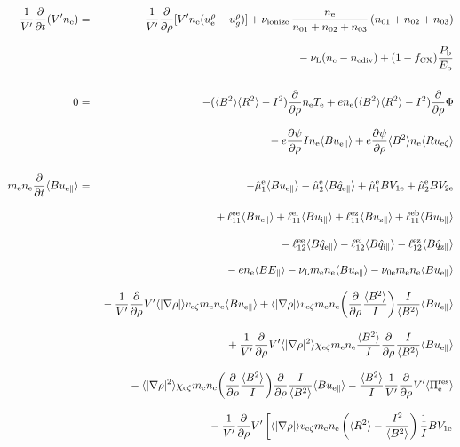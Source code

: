 \documentclass[11pt]{article}
\def\r#1{{\rm#1}}
\def\aves#1{\langle#1\rangle}
\def\dd#1#2{\frac{\partial #1}{\partial #2}}
\def\para{\parallel}
\def\ddrho{\frac{\partial}{\partial\rho}}
\def\ddt{\frac{\partial}{\partial t}}
\def\me{m_\r{e}}
\def\nee{n_\r{e}}
\def\Te{T_\r{e}}
\def\uzt#1{u_{\r{#1}\zeta}}
\def\upara#1{u_{\r{#1}\para}}
\def\qhatpara#1{\hat{q}_{\r{#1}\para}}
\def\urho#1{u_\r{#1}^\rho}
\def\ugrho{u_{g}^\rho}
\def\chis#1{\chi_\r{#1}}
\def\nun#1{\nu_\r{0#1}}
\def\ndiv#1{n_\r{#1div}}
\def\bri{\aves{B^2}\aves{R^2} - I^2}
\def\Pb{P_\r{b}}
\def\Eb{E_\r{b}}
\def\nna{n_{01}}
\def\nnb{n_{02}}
\def\nnc{n_{03}}
\def\fCX{f_\r{CX}}
\def\nuL{\nu_\r{L}}
\def\nuion{\nu_\r{ionize}}
\begin{document}
%
\begin{eqnarray}
  \frac{1}{V'} \ddt ( V' \nee ) &=&
%
  - \frac{1}{V'} \ddrho [ V' \nee (\urho{e} - \ugrho) ] 
%
  + \nuion\, \frac{\nee}{\nna + \nnb + \nnc}\, (\nna + \nnb + \nnc)
\nonumber\\[3mm]&&{}
%
  - \nuL (\nee - \ndiv{e})
%
  + (1 - \fCX) \frac{\Pb}{\Eb}
\\[5mm]
  0 &=&
%
  -        ( \bri ) \ddrho \nee \Te
%
  + e \nee ( \bri ) \ddrho \Phi
\nonumber\\[3mm]&&{}
%
  - e \dd{\psi}{\rho} I          \nee \aves{B\upara{e}}
%
  + e \dd{\psi}{\rho} \aves{B^2} \nee \aves{R\uzt{e}}
\\[5mm]
  \me \nee \ddt \aves{B \upara{e}} &=&
%
  - \hat{\mu}_1^\r{e} \aves{B \upara{e}} 
  - \hat{\mu}_2^\r{e} \aves{B \qhatpara{e}} 
%
  + \hat{\mu}_1^\r{e} {B V_{1\r{e}}} 
  + \hat{\mu}_2^\r{e} {B V_{2\r{e}}}
\nonumber\\[3mm]&&{}
%
  + \ell_{11}^{\r{ee}} \aves{B \upara{e}}
  + \ell_{11}^{\r{ei}} \aves{B \upara{i}}
  + \ell_{11}^{\r{ez}} \aves{B \upara{z}}
  + \ell_{11}^{\r{eb}} \aves{B \upara{b}}
\nonumber\\[3mm]&&{}
%
  - \ell_{12}^{\r{ee}} \aves{B \qhatpara{e}} 
  - \ell_{12}^{\r{ei}} \aves{B \qhatpara{i}} 
  - \ell_{12}^{\r{ez}} \aves{B \qhatpara{z}} 
\nonumber\\[3mm]&&{}
%
  - e \nee \aves{B E_\para}
%
%
  - \nuL \me \nee \aves{B \upara{e}}
%
  - \nun{e} \me \nee \aves{B \upara{e}}
\nonumber\\[3mm]&&{}
%
  - \frac{1}{V'} \ddrho V' \aves{|\nabla \rho|} v_{\r{e}\zeta} \me \nee \aves{B \upara{e}}
%
  + \aves{|\nabla \rho|} v_{\r{e}\zeta} \me \nee 
  \biggl(\ddrho \frac{\aves{B^2}}{I} \biggl) \frac{I}{\aves{B^2}} \aves{B \upara{e}}
\nonumber\\[3mm]&&{}
%
  + \frac{1}{V'} \ddrho V' \aves{|\nabla \rho|^2} \chis{e\zeta} \me \nee
  \frac{\aves{B^2}}{I} \ddrho \frac{I}{\aves{B^2}} \aves{B \upara{e}}
\nonumber\\[3mm]&&{}
%
  - \aves{|\nabla \rho|^2} \chis{e\zeta} \me \nee \biggl( \ddrho
  \frac{\aves{B^2}}{I} \biggr) \ddrho \frac{I}{\aves{B^2}} \aves{B \upara{e}}
%
  - \frac{\aves{B^2}}{I} \frac{1}{V'} \ddrho V' \aves{\Pi_\r{e}^\r{res}}
\nonumber\\[3mm]&&{}
%
  - \frac{1}{V'} \ddrho V' 
    \left[  \aves{|\nabla\rho|} v_{\r{e}\zeta} \me \nee
          \left(\aves{R^2} - \frac{I^2}{\aves{B^2}}\right) \frac{1}{I}BV_{1\r{e}} \right.

\end{eqnarray}
\end{document}
